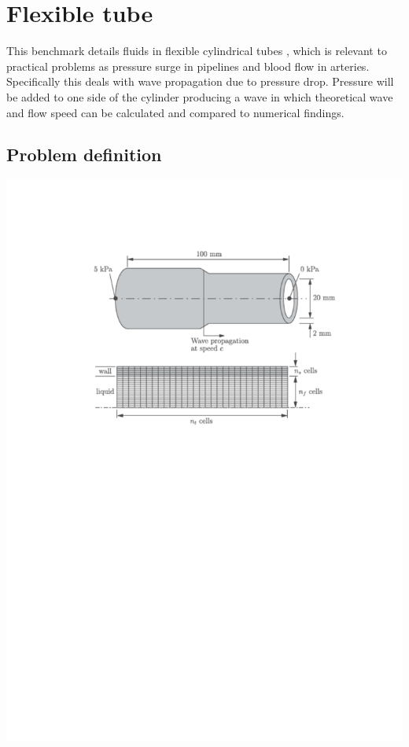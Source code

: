 \newpage
\newpage
\section{Flexible tube}
This benchmark details fluids in flexible cylindrical tubes \cite{Greenshields2005}, which is relevant to practical problems as pressure surge in pipelines and blood flow in arteries. Specifically this deals with wave propagation due to pressure drop. Pressure will be added to one side of the cylinder producing a wave in which theoretical wave and flow speed can be calculated and compared to numerical findings.

\subsection{Problem definition}
\begin{center} 
\includegraphics[scale=0.6,trim={0 15cm 0 10},clip]{./Verification_Validation/Flexible_tube/Pictures/definition.pdf}
\end{center}

